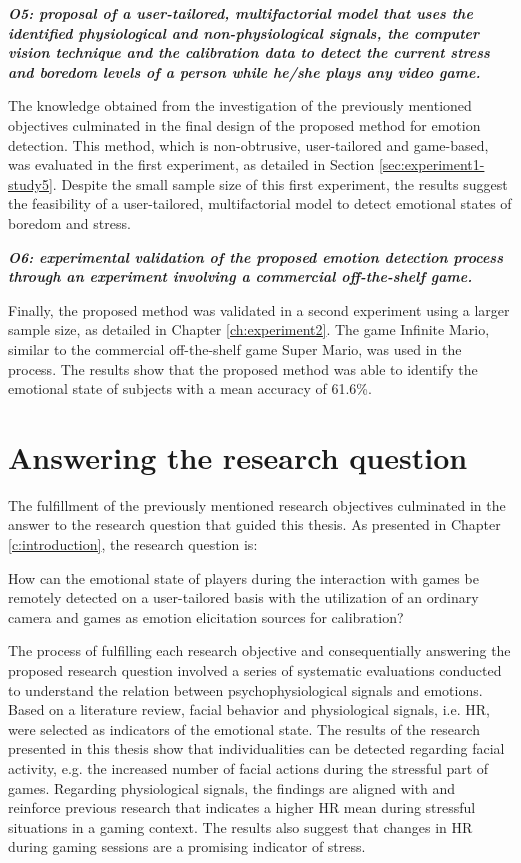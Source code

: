 \textit{\textbf{O5: proposal of a user-tailored, multifactorial model that uses the identified physiological and non-physiological signals, the computer vision technique and the calibration data to detect the current stress and boredom levels of a person while he/she plays any video game.}}

The knowledge obtained from the investigation of the previously mentioned objectives culminated in the final design of the proposed method for emotion detection. This method, which is non-obtrusive, user-tailored and game-based, was evaluated in the first experiment, as detailed in Section \ref{sec:experiment1-study5}. Despite the small sample size of this first experiment, the results suggest the feasibility of a user-tailored, multifactorial model to detect emotional states of boredom and stress.

\textit{\textbf{O6: experimental validation of the proposed emotion detection process through an experiment involving a commercial off-the-shelf game.}}

Finally, the proposed method was validated in a second experiment using a larger sample size, as detailed in Chapter \ref{ch:experiment2}. The game Infinite Mario, similar to the commercial off-the-shelf game Super Mario, was used in the process. The results show that the proposed method was able to identify the emotional state of subjects with a mean accuracy of 61.6\%.

\section{Answering the research question}

The fulfillment of the previously mentioned research objectives culminated in the answer to the research question that guided this thesis. As presented in Chapter \ref{c:introduction}, the research question is:

\begin{fquote}
How can the emotional state of players during the interaction with games be remotely detected on a user-tailored basis with the utilization of an ordinary camera and games as emotion elicitation sources for calibration?
\end{fquote}

The process of fulfilling each research objective and consequentially answering the proposed research question involved a series of systematic evaluations conducted to understand the relation between psychophysiological signals and emotions. Based on a literature review, facial behavior and physiological signals, i.e. HR, were selected as indicators of the emotional state. The results of the research presented in this thesis show that individualities can be detected regarding facial activity, e.g. the increased number of facial actions during the stressful part of games. Regarding physiological signals, the findings are aligned with and reinforce previous research that indicates a higher HR mean during stressful situations in a gaming context. The results also suggest that changes in HR during gaming sessions are a promising indicator of stress.


